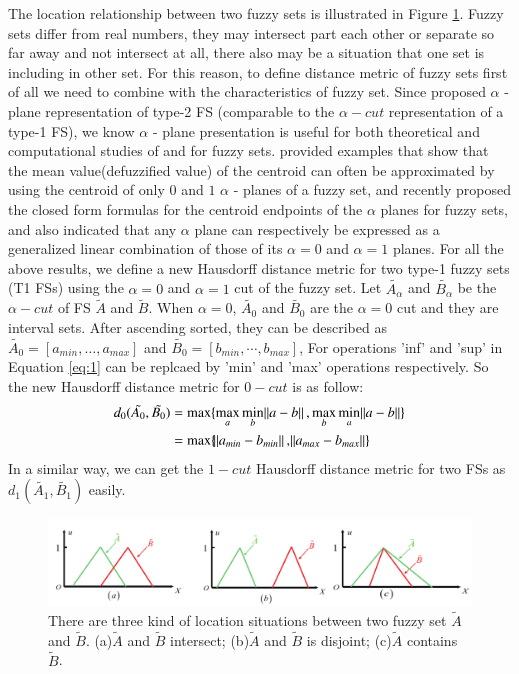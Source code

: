 \documentclass[preprint,12pt,authoryear]{elsarticle}
\begin{document}
 The location relationship between two fuzzy sets is illustrated in Figure \ref{fig:2}. Fuzzy sets differ from real numbers, they may intersect part each other or separate so far away and not intersect at all, there also may be a situation that one set is including in other set. For this reason, to define distance metric of fuzzy sets first of all we need to combine with the characteristics of fuzzy set. Since \citep{liu2008efficient, mendel2009alpha} proposed $\alpha$ - plane representation of type-2 FS (comparable to the $\alpha - cut$ representation of a type-1 FS), we know $\alpha$ - plane presentation is useful for both theoretical and computational studies of and for fuzzy sets. \cite{liu2008efficient} provided examples that show that the mean value(defuzzified value) of the centroid can often be approximated by using the centroid of only $0$ and $1$ $\alpha$ - planes of a fuzzy set, and \cite{nie2015closed} recently proposed the closed form formulas for the centroid endpoints of the $\alpha$ planes for fuzzy sets, and also indicated that any $\alpha$ plane can respectively be expressed as a generalized linear combination of those of its $\alpha= 0$ and $\alpha = 1 $ planes. For all the above results, we define a new Hausdorff distance metric for two type-1 fuzzy sets (T1 FSs) using the $\alpha= 0$ and $\alpha = 1 $ cut of the fuzzy set. Let $\tilde{A_{\alpha}}$ and $\tilde{B_{\alpha}}$  be the $\alpha - cut$ of FS $\tilde{A}$ and $\tilde{B}$. When $\alpha = 0$, $\tilde{A_0}$ and $\tilde{B_{0}}$ are the $\alpha = 0$ cut and they are interval sets. After ascending sorted, they can be described as $\tilde{A_0} = [a_{min},\dots,a_{max}]$ and $\tilde{B_{0}} = [b_{min}, \cdots, b_{max}]$, For operations 'inf' and 'sup' in Equation \ref{eq:1} can be replcaed by 'min' and 'max' operations respectively. So the new Hausdorff distance metric for $0-cut$ is as follow:
 \begin{equation}\label{eq:2}
 \begin{split}
   d_0 (\tilde{A_0}, \tilde{B_{0}}) &= \max \lbrace \max_a \min_b \norm{a-b}, \max_b \min_a \norm{a-b} \rbrace \\
   &= \max \lbrace \norm{a_{min}-b_{min}}, \norm{a_{max}-b_{max}} \rbrace
   \end{split}
 \end{equation}
 In a similar way, we can get the $1-cut$ Hausdorff distance metric for two FSs as $ d_1 (\tilde{A_1}, \tilde{B_{1}})$ easily.

\begin{figure}
\centering
\includegraphics[width=14 cm]{figures/Fig2}
\caption{There are three kind of location situations between two fuzzy set $\tilde{A}$ and $\tilde{B}$. (a)$\tilde{A}$ and $\tilde{B}$ intersect; (b)$\tilde{A}$ and $\tilde{B}$ is disjoint;  (c)$\tilde{A}$ contains $\tilde{B}$. }\label{fig:2}
\end{figure}
\end{document}
